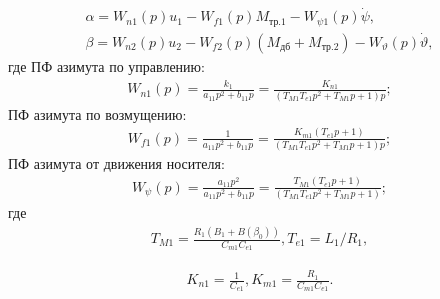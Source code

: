 \begin{equation}
\label{eq:p4:s3.3}
\begin{aligned}
\alpha= 
W_{n1}(p) u_{1} - 
W_{f1}(p) M_{\textit{тр.1}} - 
W_{\psi 1}(p) \dot \psi  ,\\
\beta=
W_{n2}(p) u_{2} - 
W_{f2}(p) (M_{\textit{дб}} + M_{\textit{тр.2}}) - 
W_{\vartheta}(p) \dot \vartheta,
\end{aligned}
\end{equation}
где
ПФ азимута по управлению:
\begin{equation}
\label{eq:p4:s3.4}
\begin{multlined}
W_{n1}(p) = \frac{k_{1}}{a_{11}p^{2}+b_{11}p} = \frac{K_{n1}}{(T_{M1} T_{e1} p^2 + T_{M1} p +1)p};
\end{multlined}
\end{equation}
ПФ азимута по возмущению:
\begin{equation}
\label{eq:p4:s3.5}
\begin{multlined}
W_{f1}(p) = \frac{1}{a_{11}p^{2}+b_{11}p} =  \frac{K_{m1} (T_{e1} p +1)}{(T_{M1} T_{e1} p^2 + T_{M1} p +1)p};
\end{multlined}
\end{equation}
ПФ азимута от движения носителя:
\begin{equation}
\label{eq:p4:s3.6}
\begin{multlined}
W_{\psi}(p) = \frac{a_{11} p^2}{a_{11}p^{2}+b_{11}p} =  \frac{T_{M1}(T_{e1} p +1)}{(T_{M1} T_{e1} p^2 + T_{M1} p +1)};
\end{multlined}
\end{equation}
где 
\begin{equation}
\label{eq:p4:tt1}
\begin{aligned}
T_{M1} =\frac{R_1 (B_1 + B(\beta_0))}{C_{m1}C_{e1}},
T_{e1} = L_1/R_1,
\end{aligned}
\end{equation}

\begin{equation}
\label{eq:p4:kk1}
\begin{aligned}
K_{n1}=\frac{1}{C_{e1}},
K_{m1}= \frac{R_1}{C_{m1}C_{e1}}.
\end{aligned}
\end{equation}


